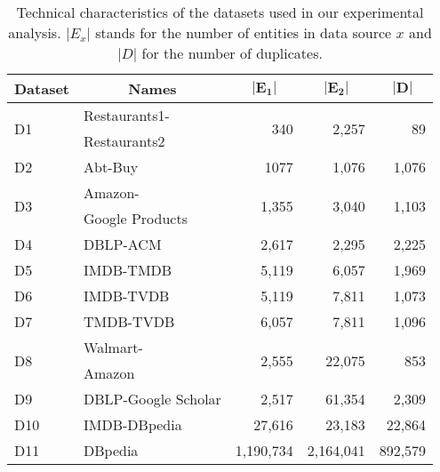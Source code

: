 \begin{table}[t]
\centering 
\small 
\caption{Technical characteristics of the datasets used in our experimental analysis. $|E_x|$ stands for the number of entities in data source $x$ and $|D|$ for the number of duplicates. 
} 
\label{tab:dataset-specs}
\begin{tabular}{|p{0.9cm}|p{2.1cm}|r|r|r|}
\hline
\multicolumn{1}{|c|}{\textbf{Dataset}} & \multicolumn{1}{|c|}{\textbf{Names}} & \multicolumn{1}{|c|}{\textbf{$\mathbf{|E_1|}$}} & \multicolumn{1}{|c|}{{$\mathbf{|E_2|}$}} & \multicolumn{1}{|c|}{\textbf{$\mathbf{|D|}$}} \\
\hline
\hline
\multirow{2}{*}{D1} & Restaurants1-& \multirow{2}{*}{340} & \multirow{2}{*}{2,257} & \multirow{2}{*}{89} \\
& Restaurants2 & & & \\
\hline
D2 & Abt-Buy & 1077 & 1,076 & 1,076 \\
\hline
\multirow{2}{*}{D3} & Amazon- & \multirow{2}{*}{1,355} & \multirow{2}{*}{3,040} & \multirow{2}{*}{1,103} \\
& Google Products & & & \\
\hline
D4 & DBLP-ACM & 2,617 & 2,295 & 2,225 \\
\hline
D5 & IMDB-TMDB & 5,119 & 6,057 & 1,969 \\
\hline
D6 & IMDB-TVDB & 5,119 & 7,811 & 1,073 \\
\hline
D7 & TMDB-TVDB & 6,057 & 7,811 & 1,096 \\
\hline
\multirow{2}{*}{D8} & Walmart- & \multirow{2}{*}{2,555} & \multirow{2}{*}{22,075} & \multirow{2}{*}{853} \\
& Amazon & & & \\
\hline
D9 & DBLP-Google Scholar & 2,517 & 61,354 & 2,309 \\
\hline
D10 & IMDB-DBpedia & 27,616 & 23,183 & 22,864 \\
\hline
\hline
D11 & DBpedia & 1,190,734 & 2,164,041 & 892,579 \\
\hline
\end{tabular}
\end{table}